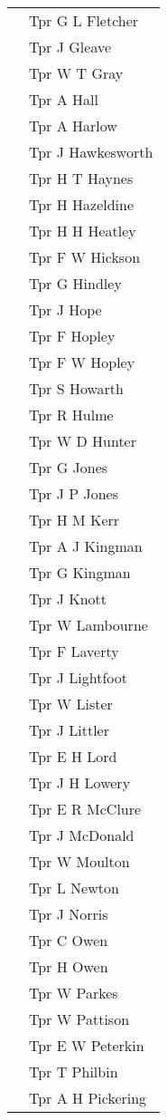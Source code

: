 \begin{center}
\begin{tabular}{rl}
    & Tpr G L Fletcher \\
    & Tpr J Gleave \\
    & Tpr W T Gray \\
    & Tpr A Hall \\
    & Tpr A Harlow \\
    & Tpr J Hawkesworth \\
    & Tpr H T Haynes \\
    & Tpr H Hazeldine \\
    & Tpr H H Heatley \\
    & Tpr F W Hickson \\
    & Tpr G Hindley \\
    & Tpr J Hope \\
    & Tpr F Hopley \\
    & Tpr F W Hopley \\
    & Tpr S Howarth \\
    & Tpr R Hulme \\
    & Tpr W D Hunter \\
    & Tpr G Jones \\
    & Tpr J P Jones \\
    & Tpr H M Kerr \\
    & Tpr A J Kingman \\
    & Tpr G Kingman \\
    & Tpr J Knott \\
    & Tpr W Lambourne \\
    & Tpr F Laverty \\
    & Tpr J Lightfoot \\
    & Tpr W Lister \\
    & Tpr J Littler \\
    & Tpr E H Lord \\
    & Tpr J H Lowery \\
    & Tpr E R McClure \\
    & Tpr J McDonald \\
    & Tpr W Moulton \\
    & Tpr L Newton \\
    & Tpr J Norris \\
    & Tpr C Owen \\
    & Tpr H Owen \\
    & Tpr W Parkes \\
    & Tpr W Pattison \\
    & Tpr E W Peterkin \\
    & Tpr T Philbin \\
    & Tpr A H Pickering \\

\end{tabular}
\end{center}
